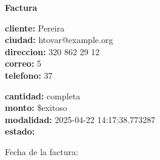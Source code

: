 \documentclass{article}
\begin{document}
\begin{center}
    {\LARGE \textbf{Factura}}\\[1cm]
\end{center}

\textbf{cliente:} Pereira \\
\textbf{ciudad:} htovar@example.org \\
\textbf{direccion:} 320 862 29 12 \\
\textbf{correo:} 5 \\
\textbf{telefono:} 37 \\

\vspace{0.5cm}

\textbf{cantidad:} completa \\
\textbf{monto:} \$exitoso \\
\textbf{modalidad:} 2025-04-22 14:17:38.773287 \\
\textbf{estado:}  \\

\vspace{1cm}

Fecha de la factura: 
\end{document}
